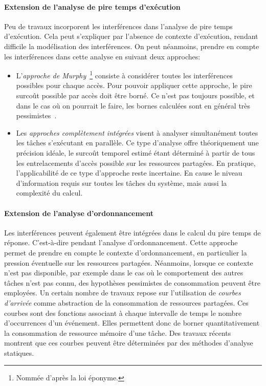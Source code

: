 \paragraph{Extension de l'analyse de pire temps d'exécution}
Peu de travaux incorporent les interférences dans l'analyse de pire temps d'exécution. 
Cela peut s'expliquer par l'absence de contexte d'exécution, rendant difficile la modélisation des interférences.
On peut néanmoins, prendre en compte les interférences dans cette analyse en suivant deux approches:
\begin{itemize}
	\item L'\emph{approche de Murphy}~\cite{abel2013impact}\footnote{Nommée d'après la loi éponyme.} consiste à considérer toutes les interférences possibles pour chaque accès.
	Pour pouvoir appliquer cette approche, le pire surcoût possible par accès doit être borné.
	Ce n'est pas toujours possible, et dans le cas où on pourrait le faire, les bornes calculées sont en général très pessimistes~\cite{perret2016predictable,nowotsch2014multi}.

	\item Les \emph{approches complètement intégrées} visent à analyser simultanément toutes les tâches s'exécutant en parallèle.
	Ce type d'analyse offre théoriquement une précision idéale, le surcoût temporel estimé étant déterminé à partir de tous les entrelacements d'accès possible sur les ressources partagées.
	En pratique, l'applicabilité de ce type d'approche reste incertaine.
	En cause le niveau d'information requis sur toutes les tâches du système, mais aussi la complexité du calcul.
\end{itemize}

\paragraph{Extension de l'analyse d'ordonnancement}
Les interférences peuvent également être intégrées dans le calcul du pire temps de réponse.
C'est-à-dire pendant l'analyse d'ordonnancement.
Cette approche permet de prendre en compte le contexte d'ordonnancement, en particulier la pression éventuelle sur les ressources partagées.
Néanmoins, lorsque ce contexte n'est pas disponible, par exemple dans le cas où le comportement des autres tâches n'est pas connu, des hypothèses pessimistes de consommation peuvent être employées.
Un certain nombre de travaux repose sur l'utilisation de \emph{courbes d'arrivée} comme abstraction de la consommation de ressources partagées.
Ces courbes sont des fonctions associant à chaque intervalle de temps le nombre d'occurrences d'un événement.
Elles permettent donc de borner quantitativement la consommation de ressource mémoire d'une tâche.
Des travaux récents~\cite{oehlert2018compiler} montrent que ces courbes peuvent être déterminées par des méthodes d'analyse statiques.

